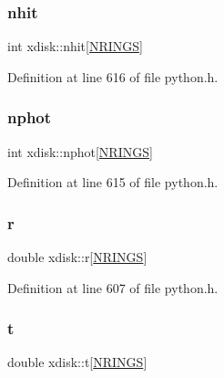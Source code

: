 \mbox{\label{structxdisk_a85fc4d26f2ff6970c94cb6ac75d3b8cb}} 
\subsubsection{\texorpdfstring{nhit}{nhit}}
{\footnotesize\ttfamily int xdisk\+::nhit\mbox{[}\hyperlink{python_8h_af8b02d1bed15b59f7062901b55c4d123}{N\+R\+I\+N\+GS}\mbox{]}}



Definition at line 616 of file python.\+h.

\mbox{\label{structxdisk_a5812ceecd51e235f48eccda5b854f8e8}} 
\subsubsection{\texorpdfstring{nphot}{nphot}}
{\footnotesize\ttfamily int xdisk\+::nphot\mbox{[}\hyperlink{python_8h_af8b02d1bed15b59f7062901b55c4d123}{N\+R\+I\+N\+GS}\mbox{]}}



Definition at line 615 of file python.\+h.

\mbox{\label{structxdisk_a4ca6d46d2d2873fbd971da347b14b073}} 
\subsubsection{\texorpdfstring{r}{r}}
{\footnotesize\ttfamily double xdisk\+::r\mbox{[}\hyperlink{python_8h_af8b02d1bed15b59f7062901b55c4d123}{N\+R\+I\+N\+GS}\mbox{]}}



Definition at line 607 of file python.\+h.

\mbox{\label{structxdisk_a88f7151e3a7f53de1fb9766c0d41b382}} 
\subsubsection{\texorpdfstring{t}{t}}
{\footnotesize\ttfamily double xdisk\+::t\mbox{[}\hyperlink{python_8h_af8b02d1bed15b59f7062901b55c4d123}{N\+R\+I\+N\+GS}\mbox{]}}



